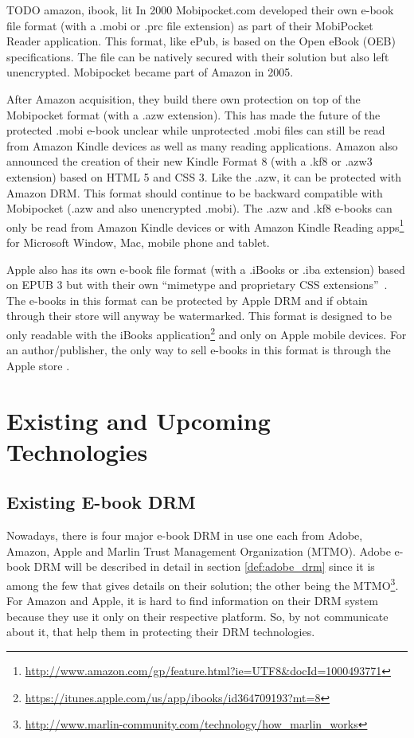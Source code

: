 \documentclass[11pt,a4paper,oneside]{memoir}
\begin{document}
\label{def:e-book:iba:azw} TODO amazon, ibook, lit
In 2000 Mobipocket.com developed their own e-book file format (with a .mobi or .prc file extension) as part of their MobiPocket Reader application. This format, like ePub, is based on the Open eBook (OEB) specifications. The file can be natively secured with their solution but also left unencrypted. Mobipocket became part of Amazon in 2005. \cite{mobi:about}

After Amazon acquisition, they build there own protection on top of the Mobipocket format (with a .azw extension). This has made the future of the protected .mobi e-book unclear \cite{tdr:rip_mobi} while unprotected .mobi files can still be read from Amazon Kindle devices as well as many reading applications. Amazon also announced the creation of their new Kindle Format 8 (with a .kf8 or .azw3 extension) based on HTML 5 and CSS 3. Like the .azw, it can be protected with Amazon DRM. This format should continue to be backward compatible with Mobipocket (.azw and also unencrypted .mobi). The .azw and .kf8 e-books can only be read from Amazon Kindle devices or with Amazon Kindle Reading apps\footnote{\url{http://www.amazon.com/gp/feature.html?ie=UTF8&docId=1000493771}} for Microsoft Window, Mac, mobile phone and tablet\cite{amazon:kf8}.

Apple also has its own e-book file format (with a .iBooks or .iba extension) based on EPUB 3 but with their own \textquotedblleft mimetype and proprietary CSS extensions\textquotedblright ~\cite{glaz:iba}. The e-books in this format can be protected by Apple DRM and if obtain through their store will anyway be watermarked. This format is designed to be only readable with the iBooks application\footnote{\url{https://itunes.apple.com/us/app/ibooks/id364709193?mt=8}} and only on Apple mobile devices. For an author/publisher, the only way to sell e-books in this format is through the Apple store \cite{apple:iba_faq}. 

 


\chapter{Existing and Upcoming Technologies}

\section{Existing E-book DRM}

Nowadays, there is four major e-book DRM in use one each from Adobe, Amazon, Apple and Marlin Trust Management Organization (MTMO). Adobe e-book DRM will be described in detail in section \vref{def:adobe_drm} since it is among the few that gives details on their solution; the other being the MTMO\footnote{\url{http://www.marlin-community.com/technology/how_marlin_works}}. For Amazon and Apple, it is hard to find information on their DRM system because they use it only on their respective platform. So, by not communicate about it, that help them in protecting their DRM technologies.
\end{document}

